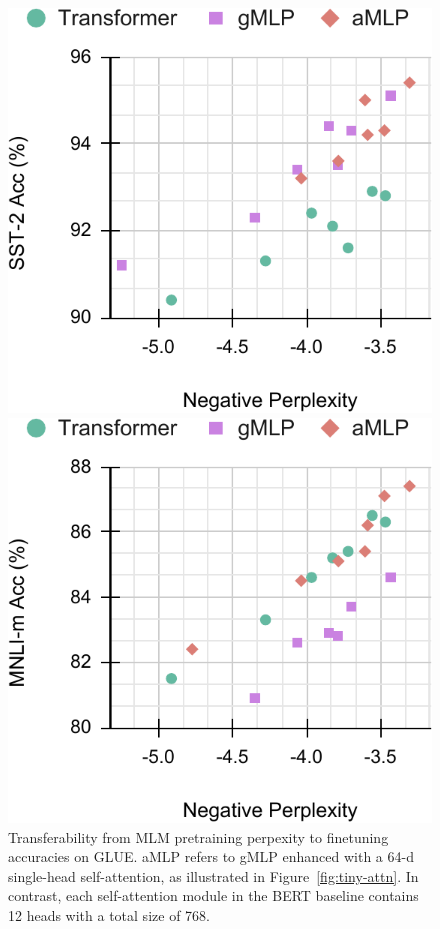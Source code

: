 \documentclass{article}
\begin{document}
\begin{figure}[h]
    \centering
    \begin{minipage}{0.4\linewidth}
        \includegraphics[width=0.9\linewidth]{figures/pplx-vs-sst.pdf}
    \end{minipage}
    \begin{minipage}{0.4\linewidth}
        \includegraphics[width=0.9\linewidth]{figures/pplx-vs-mnli.pdf}
    \end{minipage}
    \caption{Transferability from MLM pretraining perpexity to finetuning accuracies on GLUE. aMLP refers to gMLP enhanced with a 64-d single-head self-attention, as illustrated in Figure~\ref{fig:tiny-attn}. In contrast, each self-attention module in the BERT baseline contains 12 heads with a total size of 768.}
    \label{fig:transferability}
\end{figure}
\end{document}

